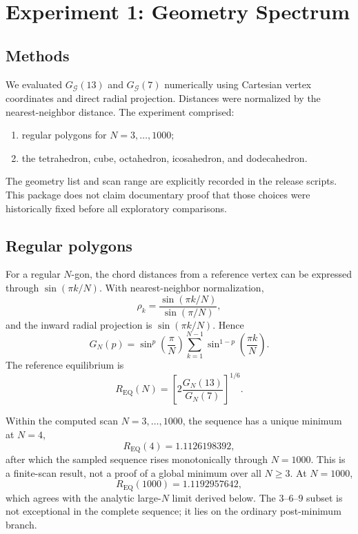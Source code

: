 \documentclass[11pt]{article}
\begin{document}
\section{Experiment 1: Geometry Spectrum}
\subsection{Methods}
We evaluated $G_{\mathcal G}(13)$ and $G_{\mathcal G}(7)$ numerically using Cartesian vertex coordinates and direct radial projection. Distances were normalized by the nearest-neighbor distance. The experiment comprised:
\begin{enumerate}[nosep]
\item regular polygons for $N=3,\dots,1000$;
\item the tetrahedron, cube, octahedron, icosahedron, and dodecahedron.
\end{enumerate}
The geometry list and scan range are explicitly recorded in the release scripts. This package does not claim documentary proof that those choices were historically fixed before all exploratory comparisons.

\subsection{Regular polygons}
For a regular $N$-gon, the chord distances from a reference vertex can be expressed through $\sin(\pi k/N)$. With nearest-neighbor normalization,
\begin{equation}
\rho_k=\frac{\sin(\pi k/N)}{\sin(\pi/N)},
\end{equation}
and the inward radial projection is $\sin(\pi k/N)$. Hence
\begin{equation}
G_N(p)=\sin^p\left(\frac{\pi}{N}\right)\sum_{k=1}^{N-1}\sin^{1-p}\left(\frac{\pi k}{N}\right).
\end{equation}
The reference equilibrium is
\begin{equation}
R_{\mathrm{EQ}}(N)=\left[2\frac{G_N(13)}{G_N(7)}\right]^{1/6}.
\end{equation}

Within the computed scan $N=3,\ldots,1000$, the sequence has a unique minimum at $N=4$,
\begin{equation}
R_{\mathrm{EQ}}(4)=1.1126198392,
\end{equation}
after which the sampled sequence rises monotonically through $N=1000$. This is a finite-scan result, not a proof of a global minimum over all $N\ge3$. At $N=1000$,
\begin{equation}
R_{\mathrm{EQ}}(1000)=1.1192957642,
\end{equation}
which agrees with the analytic large-$N$ limit derived below. The $3$--$6$--$9$ subset is not exceptional in the complete sequence; it lies on the ordinary post-minimum branch.
\end{document}
